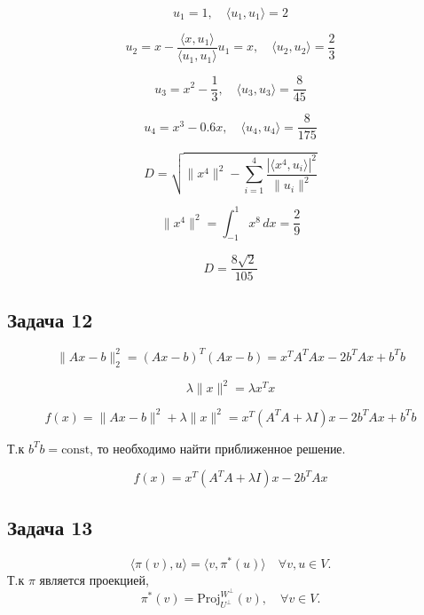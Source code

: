 \documentclass[a4paper,12pt]{article}
\begin{document}
\[
u_1 = 1, \quad 
\langle u_1, u_1 \rangle = 2
\]

\[
u_2 = x - \frac{\langle x, u_1 \rangle}{\langle u_1, u_1 \rangle} u_1 = x, \quad 
\langle u_2, u_2 \rangle = \frac{2}{3}
\]

\[
u_3 = x^2 - \frac{1}{3}, \quad 
\langle u_3, u_3 \rangle = \frac{8}{45}
\]

\[
u_4 = x^3 - 0.6x, \quad 
\langle u_4, u_4 \rangle = \frac{8}{175}
\]

\[
D =  \sqrt{ \|x^4\|^2 - \sum_{i=1}^4 \frac{|\langle x^4, u_i \rangle|^2}{\|u_i\|^2} }
\]

\[
\|x^4\|^2 = \int_{-1}^{1} x^8 \, dx = \frac{2}{9}
\]

\[
D = \frac{8\sqrt{2}}{105}
\]

\subsection{Задача 12}
\[
\|Ax - b\|_2^2 = (Ax - b)^T(Ax - b) = x^TA^TAx - 2b^TAx + b^Tb
\]

\[
\lambda \|x\|^2 = \lambda x^Tx
\]

\[
f(x) = \|Ax - b\|^2 + \lambda \|x\|^2 = x^T(A^TA + \lambda I)x - 2b^TAx + b^Tb 
\]

Т.к \( b^Tb = \text{const} \), то необходимо найти приближенное решение.

\[
f(x) = x^T(A^TA + \lambda I)x - 2b^TAx
\]

\subsection{Задача 13}

\[
\langle \pi(v), u \rangle = \langle v, \pi^*(u) \rangle \quad \forall v, u \in V.
\]
Т.к \( \pi \) является проекцией,
\[
\pi^*(v) = \text{Proj}_{U^\perp}^{W^\perp}(v), \quad \forall v \in V.
\]
\end{document}
